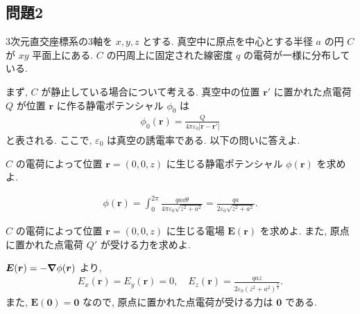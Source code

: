 \documentclass[../../ou-physics-exam.tex]{subfiles}
\begin{document}
\subsection*{問題2}
3次元直交座標系の3軸を $ x, y, z $ とする. 
真空中に原点を中心とする半径 $ a $ の円 $ C $ が $ xy $ 平面上にある. 
$ C $ の円周上に固定された線密度 $ q $ の電荷が一様に分布している.

まず, $ C $ が静止している場合について考える. 
真空中の位置 $ \bm{r'} $ に置かれた点電荷 $ Q $ が位置 $ \bm{r} $ に作る静電ポテンシャル $ \phi_0 $ は
\begin{align*}
    \phi_0 (\bm{r} ) = \frac{Q}{4 \pi \varepsilon_0 |\bm{r} - \bm{r'} |}
\end{align*}
と表される. 
ここで, $ \varepsilon_0 $ は真空の誘電率である. 
以下の問いに答えよ.

$ C $ の電荷によって位置 $ \bm{r} = (0, 0, z) $ に生じる静電ポテンシャル $ \phi (\bm{r} ) $ を求めよ.
\begin{answer}
    \begin{align*}
        \phi (\bm{r} ) = \int_0^{2 \pi} \frac{qa \dd{\theta } }{4 \pi \varepsilon_0 \sqrt{z^2 + a^2}} = \frac{qa}{2 \varepsilon_0 \sqrt{z^2 + a^2}}.
    \end{align*}
\end{answer}

$ C $ の電荷によって位置 $ \bm{r} = (0, 0, z) $ に生じる電場 $ \bm{E} (\bm{r} ) $ を求めよ. 
また, 原点に置かれた点電荷 $ Q' $ が受ける力を求めよ.
\begin{answer}
    $ \bm{E} (\bm{r} ) = - \grad \phi (\bm{r} ) $ より,
    \begin{align*}
        E_x (\bm{r} ) = E_y (\bm{r} ) = 0, \quad E_z (\bm{r} ) = \frac{qaz}{2 \varepsilon_0 (z^2 + a^2)^{\frac{3}{2}}}.
    \end{align*}
    また, $ \bm{E} (\bm{0} ) = \bm{0} $ なので, 原点に置かれた点電荷が受ける力は 
$ \bm{0} $ である.
\end{answer}
\end{document}
